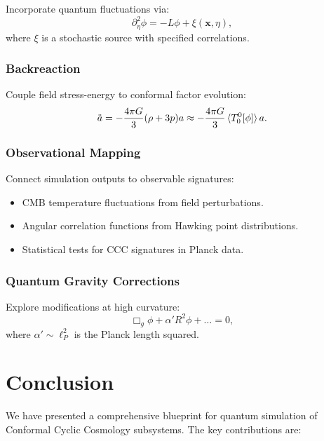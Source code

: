 \documentclass[11pt,a4paper]{article}
\newcommand{\lapg}{\Box_g}
\newcommand{\Ricci}{R}
\newcommand{\vecx}{\bm{x}}
\theoremstyle{plain}
\theoremstyle{definition}
\theoremstyle{remark}
\begin{document}
Incorporate quantum fluctuations via:
\begin{equation}
    \partial_\eta^2 \phi = -L\phi + \xi(\vecx, \eta),
\end{equation}
where $\xi$ is a stochastic source with specified correlations.

\subsubsection{Backreaction}

Couple field stress-energy to conformal factor evolution:
\begin{equation}
    \ddot{a} = -\frac{4\pi G}{3}(\rho + 3p)a \approx -\frac{4\pi G}{3}\braket{T^0_0[\phi]}a.
\end{equation}

\subsubsection{Observational Mapping}

Connect simulation outputs to observable signatures:
\begin{itemize}
    \item CMB temperature fluctuations from field perturbations.
    \item Angular correlation functions from Hawking point distributions.
    \item Statistical tests for CCC signatures in Planck data.
\end{itemize}

\subsubsection{Quantum Gravity Corrections}

Explore modifications at high curvature:
\begin{equation}
    \lapg \phi + \alpha' \Ricci^2 \phi + \ldots = 0,
\end{equation}
where $\alpha' \sim \ell_P^2$ is the Planck length squared.

\section{Conclusion}\label{sec:conclusion}

We have presented a comprehensive blueprint for quantum simulation of Conformal Cyclic Cosmology subsystems. The key contributions are:
\end{document}
